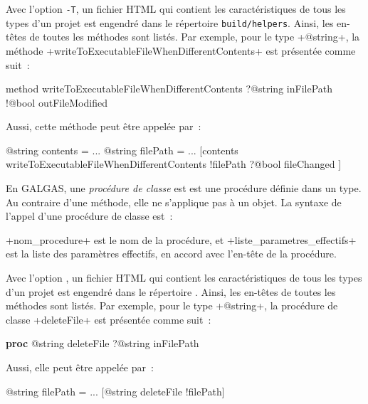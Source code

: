 Avec l'option \texttt{-T}, un fichier HTML qui contient les caractéristiques de tous les types d'un projet est engendré dans le répertoire \texttt{build/helpers}. Ainsi, les en-têtes de toutes les méthodes sont listés. Par exemple, pour le type \ggst+@string+, la méthode \ggst+writeToExecutableFileWhenDifferentContents+ est présentée comme suit~:

\begin{galgas3}
method writeToExecutableFileWhenDifferentContents
  ?@string inFilePath
  !@bool outFileModified
\end{galgas3}


Aussi, cette méthode peut être appelée par~:
\begin{galgas3}
@string contents = ...
@string filePath = ...
[contents writeToExecutableFileWhenDifferentContents
  !filePath
  ?@bool fileChanged
]
\end{galgas3}
















En GALGAS, une \emph{procédure de classe} est est une procédure définie dans un type. Au contraire d'une méthode, elle ne s'applique pas à un objet. La syntaxe de l'appel d'une procédure de classe est~:
\begin{galgas3}
\end{galgas3}

\ggst+nom_procedure+ est le nom de la procédure, et \ggst+liste_parametres_effectifs+ est la liste des paramètres effectifs, en accord avec l'en-tête de la procédure.

Avec l'option , un fichier HTML qui contient les caractéristiques de tous les types d'un projet est engendré dans le répertoire . Ainsi, les en-têtes de toutes les méthodes sont listés. Par exemple, pour le type \ggst+@string+, la procédure de classe \ggst+deleteFile+ est présentée comme suit~:

{\noindent\ttfamily
\textbf{proc} @string deleteFile ?@string inFilePath\\
}

Aussi, elle peut être appelée par~:
\begin{galgas3}
@string filePath = ...
[@string deleteFile !filePath]
\end{galgas3}










